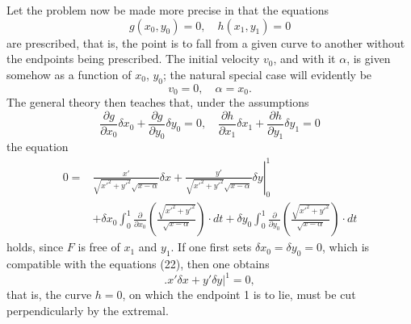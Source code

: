\documentclass[11pt,a4paper,leqno]{article}
\begin{document}
Let the problem now be made more precise in that the equations
\[
g(x_0,y_0)=0,\quad h(x_1,y_1)=0
\]
are prescribed, that is, the point is to fall from a given curve to another without the endpoints being prescribed. The initial velocity $v_0$, and with it $\alpha$, is given somehow as a function of $x_0$, $y_0$; the natural special case will evidently be
\begin{equation}\tag{21}
v_0=0,\quad \alpha=x_0.
\end{equation}
The general theory then teaches that, under the assumptions
\begin{equation}\tag{22}
\frac{\partial g}{\partial x_0}\delta x_0+\frac{\partial g}{\partial y_0}\delta y_0=0,
\quad
\frac{\partial h}{\partial x_1}\delta x_1+\frac{\partial h}{\partial y_1}\delta y_1=0
\end{equation}
the equation
\begin{equation}\tag{23}
\begin{split}
0={}&\left.\frac{x'}{\sqrt{x'^2+y'^2}\sqrt{x-\alpha}}\delta x+\frac{y'}{\sqrt{x'^2+y'^2}\sqrt{x-\alpha}}\delta y\right|_0^1\\
&+\delta x_0\int_0^1\frac{\partial}{\partial x_0}\left(\frac{\sqrt{x'^2+y'^2}}{\sqrt{x-\alpha}}\right)\cdot dt
+\delta y_0\int_0^1\frac{\partial}{\partial y_0}\left(\frac{\sqrt{x'^2+y'^2}}{\sqrt{x-\alpha}}\right)\cdot dt
\end{split}
\end{equation}
holds, since $F$ is free of $x_1$ and $y_1$. If one first sets $\delta x_0=\delta y_0=0$, which is compatible with the equations (22), then one obtains
\[
\bigl. x'\delta x+y'\delta y\bigr|^1=0,
\]
that is, the curve $h=0$, on which the endpoint 1 is to lie, must be cut perpendicularly by the extremal.
\end{document}

